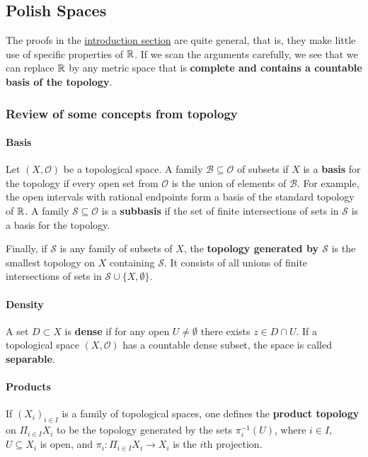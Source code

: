 \subsection{Polish Spaces}

The proofs in the \href{/perfect-subsets-r}{introduction section} are quite general, that is, they make little use of specific properties of $\mathbb{R}$. If we scan the arguments carefully, we see that we can replace $\mathbb{R}$ by any metric space that is \textbf{complete and contains a countable basis of the topology}.

\subsubsection{Review of some concepts from topology}

\paragraph{Basis}

Let $(X, \mathcal{O})$ be a topological space. A family $\mathcal{B} \subseteq \mathcal{O}$ of subsets if $X$ is a \textbf{basis} for the topology if every open set from $\mathcal{O}$ is the union of elements of $\mathcal{B}$. For example, the open intervals with rational endpoints form a basis of the standard topology of $\mathbb{R}$. A family $\mathcal{S} \subseteq \mathcal{O}$ is a \textbf{subbasis} if the set of finite intersections of sets in $\mathcal{S}$ is a basis for the topology.

Finally, if $\mathcal{S}$ is any family of subsets of $X$, the \textbf{topology generated by $\mathcal{S}$} is the smallest topology on $X$ containing $\mathcal{S}$. It consists of all unions of finite intersections of sets in $\mathcal{S} \cup \{X,\emptyset\}$.

\paragraph{Density}

A set $D \subset X$ is \textbf{dense} if for any open $U \neq \emptyset$ there exists $z \in D \cap U$. If a topological space $(X, \mathcal{O})$ has a countable dense subset, the space is called \textbf{separable}.

\paragraph{Products}

If $(X_i)_{i \in I}$ is a family of topological spaces, one defines the \textbf{product topology} on $\Pi_{i \in I} X_i$ to be the topology generated by the sets $\pi_i^{ -1}(U)$, where $i \in I$, $U \subseteq X_i$ is open, and $\pi_i: \Pi_{i \in I} X_i \to X_i$ is the $i$th projection.


